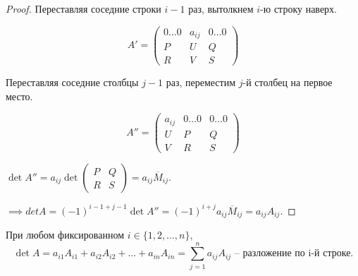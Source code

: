 \documentclass[a4paper]{article}
\begin{document}
\begin{colloq}
\begin{proof}
                Переставляя соседние строки $i - 1$ раз, вытолкнем $i$-ю строку наверх.

                \begin{equation*}
                    A' = \left(
                        \begin{array}{c|c|c}
                            0 \dots 0 & a_{ij} & 0 \dots 0 \\
                            \hline
                            P & U & Q \\
                            \hline
                            R & V & S
                        \end{array}
                    \right)
                \end{equation*}

                Переставляя соседние столбцы $j - 1$ раз, переместим $j$-й столбец на первое место.

                \begin{equation*}
                    A'' = \left(
                        \begin{array}{c|c|c}
                            a_{ij} & 0 \dots 0 & 0 \dots 0 \\
                            \hline
                            U & P & Q \\
                            \hline
                            V & R & S
                        \end{array}
                    \right)
                \end{equation*}

                $\det A'' = a_{ij} \det \left(
                    \begin{array}{c|c}
                        P & Q \\
                        \hline
                        R & S
                    \end{array}
                \right) = a_{ij} \overline{M}_{ij}$.

                \bigskip
                $\implies det A = (-1)^{i - 1 + j - 1} \det A'' = (-1)^{i + j} a_{ij} \overline{M}_{ij} = a_{ij} A_{ij}$.
            \end{proof}

            \begin{theorem}
                При любом фиксированном $i \in \{1, 2, \dots, n\}$,
                \begin{equation*}
                    \det A = a_{i1} A_{i1} + a_{i2} A_{i2} + \dots + a_{in} A_{in} = \sum_{j = 1}^n a_{ij} A_{ij} \text{ -- разложение по i-й строке}
                .\end{equation*}


\end{theorem}
\end{colloq}
\end{document}
